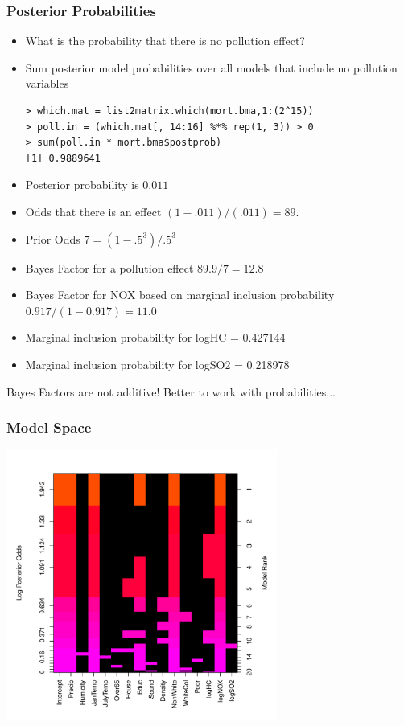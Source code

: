 \documentclass[]{beamer}
\begin{document}
\begin{frame}[fragile]
\frametitle{Posterior Probabilities}
  \begin{itemize}
  \item What is the probability that there is no pollution effect? \pause 
\item Sum posterior model probabilities over all models that include
  no pollution variables \pause 
\begin{verbatim}
> which.mat = list2matrix.which(mort.bma,1:(2^15))
> poll.in = (which.mat[, 14:16] %*% rep(1, 3)) > 0
> sum(poll.in * mort.bma$postprob)
[1] 0.9889641
\end{verbatim}\pause 
\item Posterior probability is $0.011$ \pause 
\item Odds that there is an effect  $(1 - .011)/(.011) = 89.$ \pause 
\item Prior Odds $7 = (1 - .5^3)/.5^3$ \pause 
\item Bayes Factor for a pollution effect $ 89.9/7 = 12.8$ \pause 
\item Bayes Factor for NOX based on marginal inclusion probability
  $0.917/(1 - 0.917) = 11.0$ \pause  
\item Marginal inclusion probability for logHC =  0.427144
\item Marginal inclusion probability for logSO2 = 0.218978
\end{itemize}
Bayes Factors are not additive!   Better to work with probabilities...
\end{frame}
\begin{frame}\frametitle{Model Space}
  \includegraphics[height=3.5in]{mort-image}
\end{frame}
\end{document}
